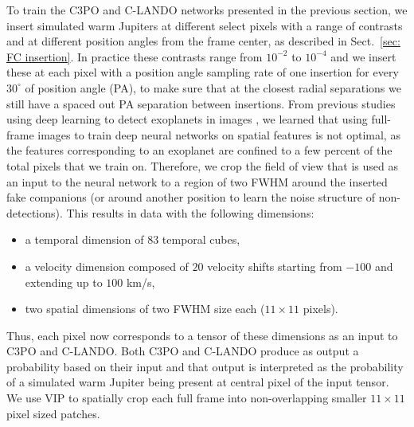 \documentclass{aa}
\begin{document}
To train the C3PO and C-LANDO networks presented in the previous section, we insert simulated warm Jupiters at different select pixels with a range of contrasts and at different position angles from the frame center, as described in Sect.~\ref{sec: FC insertion}.
In practice these contrasts range from $10^{-2}$ to $10^{-4}$ and we insert these at each pixel with a position angle sampling rate of one insertion for every $30^{\circ}$ of position angle (PA), to make sure that at the closest radial separations we still have a spaced out PA separation between insertions. From previous studies using deep learning to detect exoplanets in images \citep[e.g.,][]{2018Gomez,2023Carlito}, we learned that using full-frame images to train deep neural networks on spatial features is not optimal, as the features corresponding to an exoplanet are confined to a few percent of the total pixels that we train on. Therefore, we crop the field of view that is used as an input to the neural network to a region of two FWHM around the inserted fake companions (or around another position to learn the noise structure of non-detections).
This results in data with the following dimensions:
\begin{itemize}
    \item a temporal dimension of $83$ temporal cubes, 
    \item a velocity dimension composed of $20$ velocity shifts starting from $-100$ and extending up to $100$ km/s, 
    \item two spatial dimensions of two FWHM size each ($11\times 11$ pixels).
\end{itemize}
Thus, each pixel now corresponds to a tensor of these dimensions as an input to C3PO and C-LANDO.
Both C3PO and C-LANDO produce as output a probability based on their input and that output is interpreted as the probability of a simulated warm Jupiter being present at central pixel of the input tensor.
We use VIP to spatially crop each full frame into non-overlapping smaller $11\times11$ pixel sized patches.
\end{document}
